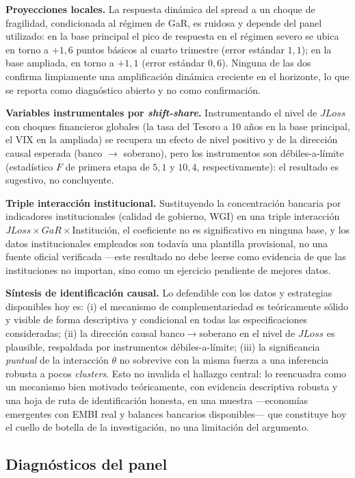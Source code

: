 \documentclass[5p,times,twocolumn,authoryear]{elsarticle}
\begin{document}
\textbf{Proyecciones locales.} La respuesta dinámica del spread a un choque de fragilidad, condicionada al régimen de GaR, es ruidosa y depende del panel utilizado: en la base principal el pico de respuesta en el régimen severo se ubica en torno a $+1{,}6$ puntos básicos al cuarto trimestre (error estándar $1{,}1$); en la base ampliada, en torno a $+1{,}1$ (error estándar $0{,}6$). Ninguna de las dos confirma limpiamente una amplificación dinámica creciente en el horizonte, lo que se reporta como diagnóstico abierto y no como confirmación.

\textbf{Variables instrumentales por \textit{shift-share}.} Instrumentando el nivel de $JLoss$ con choques financieros globales (la tasa del Tesoro a 10 años en la base principal, el VIX en la ampliada) se recupera un efecto de nivel positivo y de la dirección causal esperada (banco $\to$ soberano), pero los instrumentos son débiles-a-límite (estadístico $F$ de primera etapa de $5{,}1$ y $10{,}4$, respectivamente): el resultado es sugestivo, no concluyente.

\textbf{Triple interacción institucional.} Sustituyendo la concentración bancaria por indicadores institucionales (calidad de gobierno, WGI) en una triple interacción $JLoss\times GaR\times$Institución, el coeficiente no es significativo en ninguna base, y los datos institucionales empleados son todavía una plantilla provisional, no una fuente oficial verificada —este resultado no debe leerse como evidencia de que las instituciones no importan, sino como un ejercicio pendiente de mejores datos.

\textbf{Síntesis de identificación causal.} Lo defendible con los datos y estrategias disponibles hoy es: (i) el mecanismo de complementariedad es teóricamente sólido y visible de forma descriptiva y condicional en todas las especificaciones consideradas; (ii) la dirección causal banco$\to$soberano en el nivel de $JLoss$ es plausible, respaldada por instrumentos débiles-a-límite; (iii) la significancia \textit{puntual} de la interacción $\theta$ no sobrevive con la misma fuerza a una inferencia robusta a pocos \textit{clusters}. Esto no invalida el hallazgo central: lo reencuadra como un mecanismo bien motivado teóricamente, con evidencia descriptiva robusta y una hoja de ruta de identificación honesta, en una muestra —economías emergentes con EMBI real y balances bancarios disponibles— que constituye hoy el cuello de botella de la investigación, no una limitación del argumento.

\subsection{Diagnósticos del panel}
\end{document}
